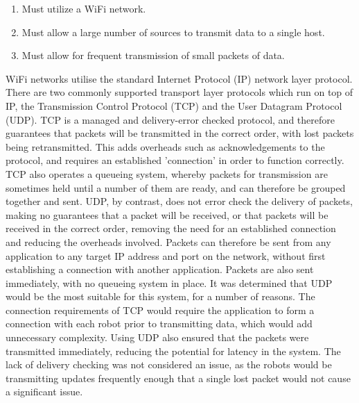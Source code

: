 \begin{enumerate}
	\item Must utilize a WiFi network.
	\item Must allow a large number of sources to transmit data to a single host.
	\item Must allow for frequent transmission of small packets of data.
\end{enumerate}

WiFi networks utilise the standard Internet Protocol (IP) network layer protocol. There are two commonly supported transport layer protocols which run on top of IP, the Transmission Control Protocol (TCP) and the User Datagram Protocol (UDP). TCP is a managed and delivery-error checked protocol, and therefore guarantees that packets will be transmitted in the correct order, with lost packets being retransmitted. This adds overheads such as acknowledgements to the protocol, and requires an established 'connection' in order to function correctly. TCP also operates a queueing system, whereby packets for transmission are sometimes held until a number of them are ready, and can therefore be grouped together and sent. UDP, by contrast, does not error check the delivery of packets, making no guarantees that a packet will be received, or that packets will be received in the correct order, removing the need for an established connection and reducing the overheads involved. Packets can therefore be sent from any application to any target IP address and port on the network, without first establishing a connection with another application. Packets are also sent immediately, with no queueing system in place. It was determined that UDP would be the most suitable for this system, for a number of reasons. The connection requirements of TCP would require the application to form a connection with each robot prior to transmitting data, which would add unnecessary complexity. Using UDP also ensured that the packets were transmitted immediately, reducing the potential for latency in the system. The lack of delivery checking was not considered an issue, as the robots would be transmitting updates frequently enough that a single lost packet would not cause a significant issue.

